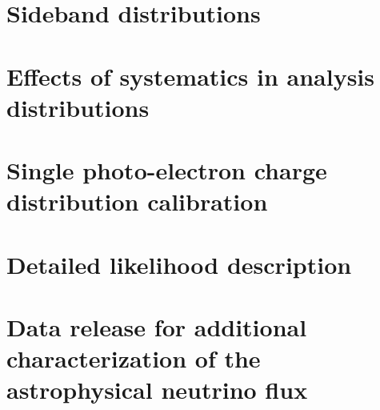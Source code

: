\documentclass[oneside, letterpaper, 10pt, oldfontcommands]{memoir}
\begin{document}
\section{Sideband distributions\label{sec:sidebands}}

\section{Effects of systematics in analysis distributions\label{sec:extendedsys}}

\section{Single photo-electron charge distribution calibration\label{sec:charge_calibration}}

\section{Detailed likelihood description\label{sec:likelihood}}

\section{Data release for additional characterization of the astrophysical neutrino flux\label{sec:release}}

\endgroup
\end{document}
